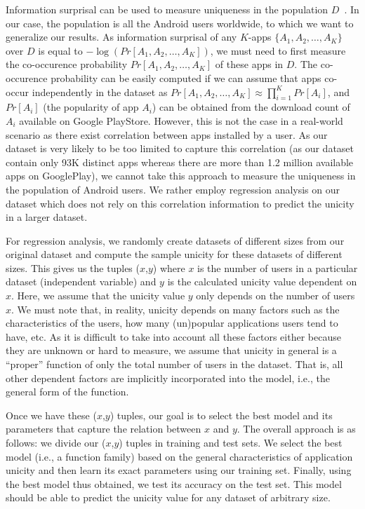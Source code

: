 \documentclass{acm_proc_article-sp}
\theoremstyle{plain}
\theoremstyle{plain}
\theoremstyle{plain}
\theoremstyle{plain}
\theoremstyle{plain}
\theoremstyle{plain}
\begin{document}
Information surprisal can be used to measure uniqueness in the population $D$~\cite{Eckersley10}.
In our case, the population is all the Android users worldwide, to which we want to generalize our results.
As information surprisal of any $K$-apps $\{A_1, A_2, \ldots, A_K\}$ over $D$ is equal to $-\log(Pr[A_1,A_2,\ldots, A_K])$, we must need to first measure the co-occurence probability $Pr[A_1,A_2,\ldots, A_K]$ of these apps in $D$.
The co-occurence probability can be easily computed if we can assume that apps co-occur independently in the dataset as $Pr[A_1,A_2,\ldots, A_K] \approx \prod_{i=1}^K Pr[A_i]$, and $Pr[A_i]$ (the popularity of app $A_i$) can be obtained from the download count of $A_i$ available on Google PlayStore.
However, this is not the case in a real-world scenario as there exist correlation between apps installed by a user.
As our dataset is very likely to be too limited to capture this correlation (as our dataset contain only 93K distinct apps whereas there are more than 1.2 million available apps on GooglePlay), we cannot take this approach to measure the uniqueness in the population of Android users.
We rather employ regression analysis on our dataset which does not rely on this correlation information to predict the unicity in a larger dataset. 


For regression analysis, we randomly create datasets of different sizes from our original dataset and compute the sample unicity for these datasets of different sizes.
This gives us the tuples ($x$,$y$) where $x$ is the number of users in a particular dataset (independent variable) and $y$ is the calculated unicity value dependent on $x$. 
Here, we assume that the unicity value $y$ only depends on the number of users $x$.  
We must note that, in reality, unicity depends on many factors such 
as the characteristics of the users, how many (un)popular applications users tend to have, etc.
As it is difficult to take into account all these factors either because they are unknown or hard to measure, we assume that unicity in general is a ``proper'' function of only the total number of users in the dataset. That is, all other dependent factors are implicitly incorporated into the model, i.e., the general form of the function.



Once we have these ($x$,$y$) tuples, our goal is to select the best model and its parameters that capture the relation between $x$ and $y$.
The overall approach is as follows: 
we divide our ($x$,$y$) tuples in training and test sets. 
We select the best model (i.e., a function family) based on the general characteristics of application unicity and then learn its exact parameters using our training set.
Finally, using the best model thus obtained, we test its accuracy on the test set.
This model should be able to predict the unicity value for any dataset of arbitrary size.
\end{document}
